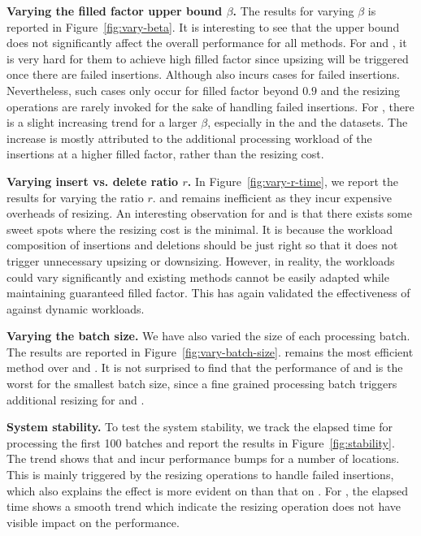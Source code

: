 \vspace{1mm}\noindent\textbf{Varying the filled factor upper bound $\beta$.}
The results for varying $\beta$ is reported in Figure~\ref{fig:vary-beta}. 
It is interesting to see that the upper bound does not significantly affect the overall performance for all methods. 
For \linear and \megakv, it is very hard for them to achieve high filled factor since upsizing will be triggered once there are failed insertions.
Although \voter also incurs cases for failed insertions. Nevertheless, such cases only occur for filled factor beyond $0.9$ and the resizing operations are rarely invoked for the sake of handling failed insertions. 
For \voter, there is a slight increasing trend for a larger $\beta$, especially in the \dsreddit and the \dsrandom datasets. 
The increase is mostly attributed to the additional processing workload of the insertions at a higher filled factor, rather than the resizing cost. 



\vspace{1mm}\noindent\textbf{Varying insert vs. delete ratio $r$.}
In Figure~\ref{fig:vary-r-time}, we report the results for varying the ratio $r$. \linear and \megakv remains inefficient as they incur expensive overheads of resizing. An interesting observation for \linear and \megakv is that there exists some sweet spots where the resizing cost is the minimal.
It is because the workload composition of insertions and deletions should be just right so that it does not trigger unnecessary upsizing or downsizing. However, in reality, the workloads could vary significantly and existing methods cannot be easily adapted while maintaining guaranteed filled factor. This has again validated the effectiveness of \voter against dynamic workloads.



\vspace{1mm}\noindent\textbf{Varying the batch size.}
We have also varied the size of each processing batch. The results are reported in Figure~\ref{fig:vary-batch-size}. \voter remains the most efficient method over \linear and \megakv. It is not surprised to find that the performance of \linear and \megakv is the worst for the smallest batch size, since a fine grained processing batch triggers additional resizing for \linear and \megakv. 



\vspace{1mm}\noindent\textbf{System stability.}
To test the system stability, we track the elapsed time for processing the first 100 batches and report the results in Figure~\ref{fig:stability}. The trend shows that \linear and \megakv incur performance bumps for a number of locations. This is mainly triggered by the resizing operations to handle failed insertions, which also explains the effect is more evident on \megakv than that on \linear. For \voter, the elapsed time shows a smooth trend which indicate the resizing operation does not have visible impact on the performance. 


